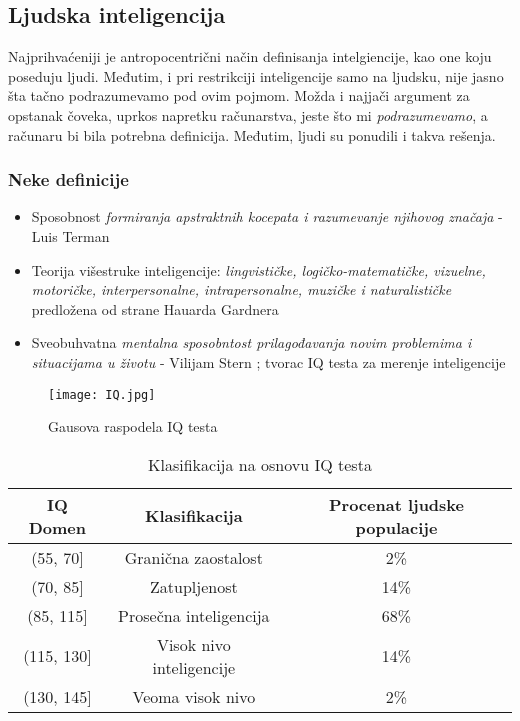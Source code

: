 \documentclass[a4paper]{article}
\begin{document}
\subsection{Ljudska inteligencija}
\label{potpoglavlje:uopsteno}
Najprihvaćeniji je antropocentrični način definisanja intelgiencije, kao one koju poseduju ljudi. Međutim, i pri restrikciji inteligencije samo na ljudsku, nije jasno šta tačno podrazumevamo pod ovim pojmom. Možda i najjači argument za opstanak čoveka, uprkos napretku računarstva, jeste što mi \emph{podrazumevamo}, a računaru bi bila potrebna definicija. Međutim, ljudi su ponudili i takva rešenja.

\subsubsection*{Neke definicije}
\label{ljudskaInt:definicije}
\begin{itemize}
    \item Sposobnost \textit{formiranja apstraktnih kocepata i razumevanje njihovog značaja} - Luis Terman \cite{terman}
    \item Teorija višestruke inteligencije: \textit{lingvističke, logičko-matematičke, vizuelne, motoričke, interpersonalne, intrapersonalne,  muzičke i naturalističke} predložena od strane Hauarda Gardnera \cite{Gardner1993-ps}
    \item Sveobuhvatna \textit{mentalna sposobntost prilagođavanja novim problemima i situacijama u životu} - Vilijam Stern \cite{stern}; tvorac IQ testa za merenje inteligencije
\end{itemize}
\begin{figure}[h!]
\begin{center}
\texttt{[image: IQ.jpg]}
\end{center}
\caption{Gausova raspodela IQ testa}
\label{fig:iqSlika}
\end{figure}

\begin{table}[h!]
\begin{center}
\caption{Klasifikacija na osnovu IQ testa}
\label{tab:tabelaIQ}
\begin{tabular}{|c|c|c|} \hline
IQ Domen & Klasifikacija & Procenat ljudske populacije\\ \hline
(55, 70]& Granična zaostalost & 2\%\\ \hline
(70, 85] & Zatupljenost & 14\%\\ \hline
(85, 115] & Prosečna inteligencija & 68\%\\ \hline
(115, 130] & Visok nivo inteligencije & 14\%\\ \hline
(130, 145] & Veoma visok nivo & 2\% \\ \hline
\end{tabular}
\end{center}
\end{table}
\end{document}
